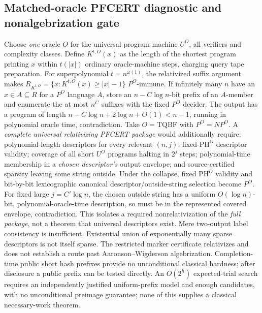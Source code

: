 \documentclass[11pt]{article}
\begin{document}
\subsection{Matched-oracle PFCERT diagnostic and nonalgebrization gate}
Choose \emph{one} oracle $O$ for the universal program machine $U^O$, all verifiers and complexity classes. Define $K^{t,O}(x)$ as the length of the shortest program printing $x$ within $t(|x|)$ ordinary oracle-machine steps, charging query tape preparation. For superpolynomial $t=n^{\omega(1)}$, the relativized suffix argument makes $R_{K^{t,O}}=\{x:K^{t,O}(x)\ge|x|-1\}$ $P^O$-immune. If infinitely many $n$ have an $x\in A\subseteq R$ for a $P^O$ language $A$, store an $n-C\log n$-bit prefix of an $A$-member and enumerate the at most $n^C$ suffixes with the fixed $P^O$ decider. The output has a program of length $n-C\log n+2\log n+O(1)<n-1$, running in polynomial oracle time, contradiction.
Take $O=\mathrm{TQBF}$ with $P^O=NP^O$. A \emph{complete universal relativizing PFCERT package} would additionally require: polynomial-length descriptors for every relevant $(n,j)$; fixed-$\mathrm{PH}^O$ descriptor validity; coverage of all short $U^O$ programs halting in $2^j$ steps; polynomial-time membership in a \emph{chosen descriptor's} output envelope; and source-certified sparsity leaving some string outside. Under the collapse, fixed $\mathrm{PH}^O$ validity and bit-by-bit lexicographic canonical descriptor/outside-string selection become $P^O$. For fixed large $j=C'\log n$, the chosen outside string has a uniform $O(\log n)$-bit, polynomial-oracle-time description, so must be in the represented covered envelope, contradiction. This isolates a required nonrelativization of the \emph{full package}, not a theorem that universal descriptors exist. Mere two-output label consistency is insufficient. Existential union of exponentially many sparse descriptors is not itself sparse. The restricted marker certificate relativizes and does not establish a route past Aaronson--Wigderson algebrization. Completion-time public short hash prefixes provide no unconditional classical hardness; after disclosure a public prefix can be tested directly. An $O(2^h)$ expected-trial search requires an independently justified uniform-prefix model and enough candidates, with no unconditional preimage guarantee; none of this supplies a classical necessary-work theorem.
\end{document}
